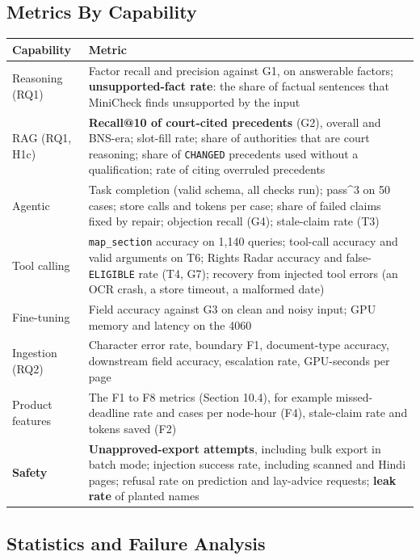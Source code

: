 \documentclass[10pt,a4paper]{article}
\newcommand{\st}[1]{\texttt{\small #1}}
\begin{document}
\subsection{Metrics By Capability}

{\small
\begin{xltabular}{\linewidth}{@{}>{\raggedright\arraybackslash{}\hsize}X>{\raggedright\arraybackslash{}\hsize}X@{}}
\toprule
\textbf{Capability} & \textbf{Metric} \\
\midrule
\endhead
Reasoning (RQ1) & Factor recall and precision against G1, on answerable factors; \textbf{unsupported-fact rate}: the share of factual sentences that MiniCheck finds unsupported by the input \\
RAG (RQ1, H1c) & \textbf{Recall@10 of court-cited precedents} (G2), overall and BNS-era; slot-fill rate; share of authorities that are court reasoning; share of \st{CHANGED} precedents used without a qualification; rate of citing overruled precedents \\
Agentic & Task completion (valid schema, all checks run); pass\textasciicircum{}3 on 50 cases; store calls and tokens per case; share of failed claims fixed by repair; objection recall (G4); stale-claim rate (T3) \\
Tool calling & \st{map\_\allowbreak{}section} accuracy on 1,140 queries; tool-call accuracy and valid arguments on T6; Rights Radar accuracy and false-\st{ELIGIBLE} rate (T4, G7); recovery from injected tool errors (an OCR crash, a store timeout, a malformed date) \\
Fine-tuning & Field accuracy against G3 on clean and noisy input; GPU memory and latency on the 4060 \\
Ingestion (RQ2) & Character error rate, boundary F1, document-type accuracy, downstream field accuracy, escalation rate, GPU-seconds per page \\
Product features & The F1 to F8 metrics (Section 10.4), for example missed-deadline rate and cases per node-hour (F4), stale-claim rate and tokens saved (F2) \\
\textbf{Safety} & \textbf{Unapproved-export attempts}, including bulk export in batch mode; injection success rate, including scanned and Hindi pages; refusal rate on prediction and lay-advice requests; \textbf{leak rate} of planted names \\
\bottomrule
\end{xltabular}}

\subsection{Statistics and Failure Analysis}
\end{document}
